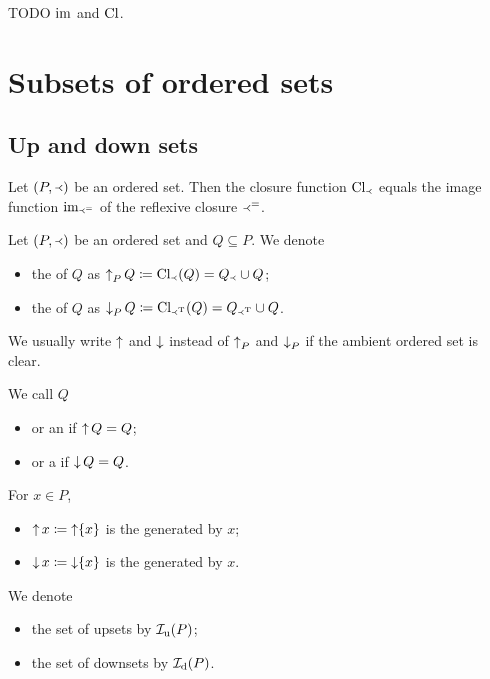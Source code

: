 TODO $\operatorname{im}$ and $\operatorname{Cl}$.

\section{Subsets of ordered sets}
\subsection{Up and down sets}
\begin{lemma} \label{imageClosureTransitiveRelations}
Let $\sSet{P, \Yleft}$ be an ordered set. Then the closure function $\operatorname{Cl}_{\Yleft}$ equals the image function $\operatorname{im}_{\Yleft^=}$ of the reflexive closure $\Yleft^=$.
\end{lemma}

\begin{definition}
Let $\sSet{P, \Yleft}$ be an ordered set and $Q\subseteq P$. We denote
\begin{itemize}
\item the  of $Q$ as $\operatorname{\uparrow}_P Q \coloneqq \operatorname{Cl}_{\Yleft}(Q) = Q_{\Yleft} \cup Q$;
\item the  of $Q$ as $\operatorname{\downarrow}_P Q \coloneqq \operatorname{Cl}_{\Yleft^{\mathrm{T}}}(Q) = Q_{\Yleft^{\mathrm{T}}} \cup Q$.
\end{itemize}
We usually write $\operatorname{\uparrow}$ and $\operatorname{\downarrow}$ instead of $\operatorname{\uparrow}_P$ and $\operatorname{\downarrow}_P$ if the ambient ordered set is clear.

We call $Q$
\begin{itemize}
\item {} or an  if $\operatorname{\uparrow} Q = Q$;
\item {} or a  if $\operatorname{\downarrow} Q = Q$.
\end{itemize}
For $x\in P$,
\begin{itemize}
\item $\operatorname{\uparrow} x \coloneqq \operatorname{\uparrow}\{x\}$ is the  generated by $x$;
\item $\operatorname{\downarrow} x \coloneqq \operatorname{\downarrow}\{x\}$ is the  generated by $x$.
\end{itemize}
We denote
\begin{itemize}
\item the set of upsets by $\operatorname{\mathcal{I}_u}(P)$;
\item the set of downsets by $\operatorname{\mathcal{I}_d}(P)$.
\end{itemize}
\end{definition}

